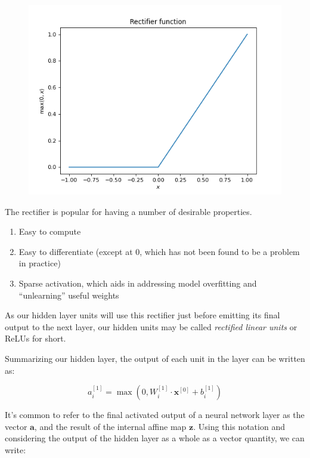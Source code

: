 \documentclass[
]{article}
\providecommand{\tightlist}{%
  \setlength{\itemsep}{0pt}\setlength{\parskip}{0pt}}
\begin{document}
\begin{figure}
\centering
\includegraphics{plots/-1637788021081228918.png}
\caption{}
\end{figure}

The rectifier is popular for having a number of desirable properties.

\begin{enumerate}
\def\labelenumi{\arabic{enumi}.}
\tightlist
\item
  Easy to compute
\item
  Easy to differentiate (except at 0, which has not been found to be a
  problem in practice)
\item
  Sparse activation, which aids in addressing model overfitting and
  ``unlearning'' useful weights
\end{enumerate}

As our hidden layer units will use this rectifier just before emitting
its final output to the next layer, our hidden units may be called
\emph{rectified linear units} or ReLUs for short.

Summarizing our hidden layer, the output of each unit in the layer can
be written as:

\[a_i^{[1]} = \max(0, W_{i}^{[1]} \cdot \mathbf{x}^{[0]} + b_i^{[1]})\]

It's common to refer to the final activated output of a neural network
layer as the vector \(\mathbf{a}\), and the result of the internal
affine map \(\mathbf{z}\). Using this notation and considering the
output of the hidden layer as a whole as a vector quantity, we can
write:
\end{document}
